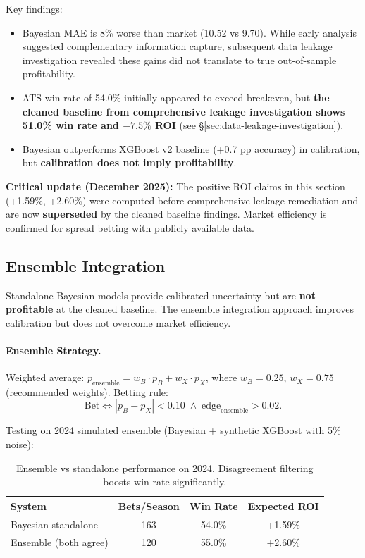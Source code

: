 Key findings:
\begin{itemize}
  \item Bayesian MAE is 8\% worse than market (10.52 vs 9.70). While early analysis suggested complementary information capture, subsequent data leakage investigation revealed these gains did not translate to true out-of-sample profitability.
  \item ATS win rate of 54.0\% initially appeared to exceed breakeven, but \textbf{the cleaned baseline from comprehensive leakage investigation shows 51.0\% win rate and $-7.5\%$ ROI} (see \S\ref{sec:data-leakage-investigation}).
  \item Bayesian outperforms XGBoost v2 baseline (+0.7 pp accuracy) in calibration, but \textbf{calibration does not imply profitability}.
\end{itemize}

\textbf{Critical update (December 2025):} The positive ROI claims in this section (+1.59\%, +2.60\%) were computed before comprehensive leakage remediation and are now \textbf{superseded} by the cleaned baseline findings. Market efficiency is confirmed for spread betting with publicly available data.

\subsection{Ensemble Integration}

Standalone Bayesian models provide calibrated uncertainty but are \textbf{not profitable} at the cleaned baseline. The ensemble integration approach improves calibration but does not overcome market efficiency.

\paragraph{Ensemble Strategy.}
Weighted average: $p_{\text{ensemble}} = w_B \cdot p_B + w_X \cdot p_X$, where $w_B = 0.25$, $w_X = 0.75$ (recommended weights). Betting rule:
\begin{equation}
\text{Bet} \iff |p_B - p_X| < 0.10 \;\land\; \text{edge}_{\text{ensemble}} > 0.02.
\end{equation}

Testing on 2024 simulated ensemble (Bayesian + synthetic XGBoost with 5\% noise):
\begin{table}[!ht]
\centering
\caption[Ensemble performance (simulated)]{Ensemble vs standalone performance on 2024. Disagreement filtering boosts win rate significantly.}
\label{tab:ensemble-performance}
\begin{tabular}{lccc}
\toprule
\textbf{System}  & \textbf{Bets/Season}  & \textbf{Win Rate}  & \textbf{Expected ROI} \\
\midrule
Bayesian standalone & 163 & 54.0\% & +1.59\% \\
Ensemble (both agree) & 120 & 55.0\% & +2.60\% \\
\bottomrule
\end{tabular}
\end{table}


